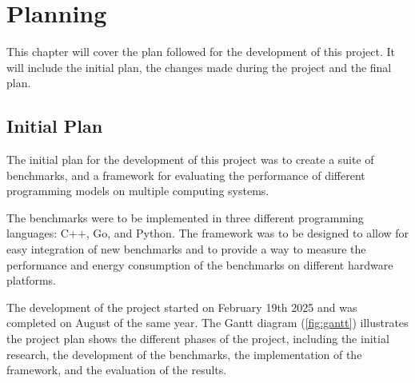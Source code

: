 \chapter{Planning}\label{chap:planning}

This chapter will cover the plan followed for the development of this project. It will include the initial plan, the changes made during the project and the final plan.

\section{Initial Plan}
The initial plan for the development of this project was to create a suite of benchmarks, and a framework for evaluating the performance of different programming models on multiple computing systems. 

The benchmarks were to be implemented in three different programming languages: C++, Go, and Python. The framework was to be designed to allow for easy integration of new benchmarks and to provide a way to measure the performance and energy consumption of the benchmarks on different hardware platforms.

The development of the project started on February 19th 2025 and was completed on August of the same year. The Gantt diagram (\autoref{fig:gantt}) illustrates the project plan shows the different phases of the project, including the initial research, the development of the benchmarks, the implementation of the framework, and the evaluation of the results.


